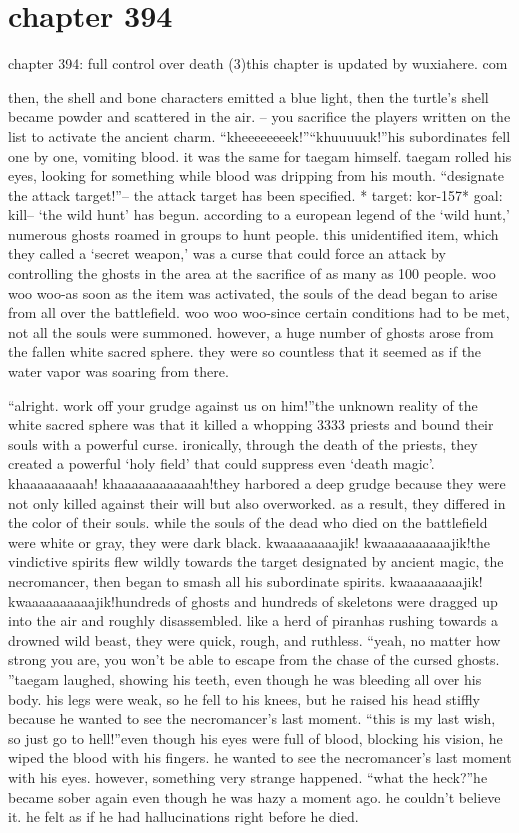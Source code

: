 \section{chapter 394}

chapter 394: full control over death (3)this chapter is updated by wuxiahere.
com




then, the shell and bone characters emitted a blue light, then the turtle’s shell became powder and scattered in the air.
– you sacrifice the players written on the list to activate the ancient charm.
“kheeeeeeeek!”“khuuuuuk!”his subordinates fell one by one, vomiting blood.
 it was the same for taegam himself.
taegam rolled his eyes, looking for something while blood was dripping from his mouth.
“designate the attack target!”– the attack target has been specified.
* target: kor-157* goal: kill– ‘the wild hunt’ has begun.
according to a european legend of the ‘wild hunt,’ numerous ghosts roamed in groups to hunt people.
 this unidentified item, which they called a ‘secret weapon,’ was a curse that could force an attack by controlling the ghosts in the area at the sacrifice of as many as 100 people.
woo woo woo-as soon as the item was activated, the souls of the dead began to arise from all over the battlefield.
woo woo woo-since certain conditions had to be met, not all the souls were summoned.
however, a huge number of ghosts arose from the fallen white sacred sphere.
 they were so countless that it seemed as if the water vapor was soaring from there.

“alright.
 work off your grudge against us on him!”the unknown reality of the white sacred sphere was that it killed a whopping 3333 priests and bound their souls with a powerful curse.
ironically, through the death of the priests, they created a powerful ‘holy field’ that could suppress even ‘death magic’.
khaaaaaaaaah! khaaaaaaaaaaaah!they harbored a deep grudge because they were not only killed against their will but also overworked.
 as a result, they differed in the color of their souls.
 while the souls of the dead who died on the battlefield were white or gray, they were dark black.
kwaaaaaaaajik! kwaaaaaaaaaajik!the vindictive spirits flew wildly towards the target designated by ancient magic, the necromancer, then began to smash all his subordinate spirits.
kwaaaaaaaajik! kwaaaaaaaaaajik!hundreds of ghosts and hundreds of skeletons were dragged up into the air and roughly disassembled.
 like a herd of piranhas rushing towards a drowned wild beast, they were quick, rough, and ruthless.
“yeah, no matter how strong you are, you won’t be able to escape from the chase of the cursed ghosts.
”taegam laughed, showing his teeth, even though he was bleeding all over his body.
his legs were weak, so he fell to his knees, but he raised his head stiffly because he wanted to see the necromancer’s last moment.
“this is my last wish, so just go to hell!”even though his eyes were full of blood, blocking his vision, he wiped the blood with his fingers.
 he wanted to see the necromancer’s last moment with his eyes.
however, something very strange happened.
“what the heck?”he became sober again even though he was hazy a moment ago.
 he couldn’t believe it.
 he felt as if he had hallucinations right before he died.

